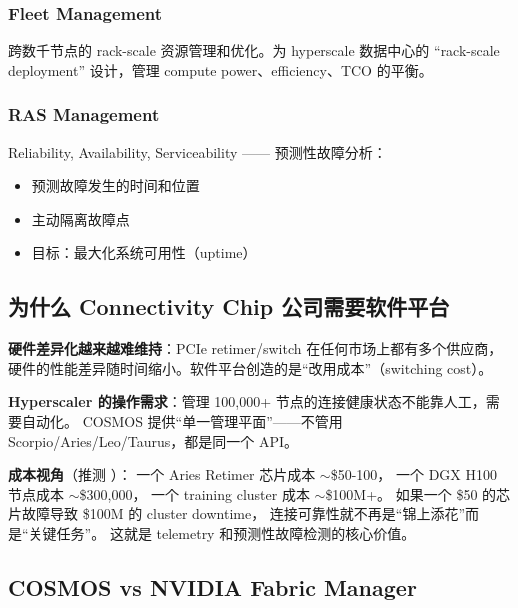 \subsubsection{Fleet Management}

跨数千节点的 rack-scale 资源管理和优化。为 hyperscale 数据中心的
``rack-scale deployment'' 设计，管理 compute power、efficiency、TCO 的平衡。

\subsubsection{RAS Management}

Reliability, Availability, Serviceability —— 预测性故障分析：
\begin{itemize}
    \item 预测故障发生的时间和位置
    \item 主动隔离故障点
    \item 目标：最大化系统可用性（uptime）
\end{itemize}

\subsection{为什么 Connectivity Chip 公司需要软件平台}

\textbf{硬件差异化越来越难维持}：PCIe retimer/switch 在任何市场上都有多个供应商，
硬件的性能差异随时间缩小。软件平台创造的是``改用成本''（switching cost）。

\textbf{Hyperscaler 的操作需求}：管理 100,000+ 节点的连接健康状态不能靠人工，需要自动化。
COSMOS 提供``单一管理平面''——不管用 Scorpio/Aries/Leo/Taurus，都是同一个 API。

\textbf{成本视角}（推测 \speculation{}）：
一个 Aries Retimer 芯片成本 $\sim$\$50-100，
一个 DGX H100 节点成本 $\sim$\$300,000，
一个 training cluster 成本 $\sim$\$100M+。
如果一个 \$50 的芯片故障导致 \$100M 的 cluster downtime，
连接可靠性就不再是``锦上添花''而是``关键任务''。
这就是 telemetry 和预测性故障检测的核心价值。

\subsection{COSMOS vs NVIDIA Fabric Manager}

